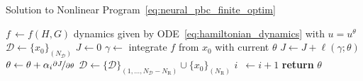 \begin{algorithm}
\caption{Solution to Nonlinear Program~\eqref{eq:neural_pbc_finite_optim}}
\label{algo:neuralpbc}
\small
\begin{algorithmic}[1]
    \algrenewcommand\algorithmicindent{0em} %
    \State $f \,\gets f(H,G)$ dynamics given by ODE~\eqref{eq:hamiltonian_dynamics} with $u = u^\theta$
    \State $\mathcal{D} \gets \{x_0\}_{(N_{\mathcal{D}})}$  
    \algrenewcommand\algorithmicindent{1.5em} %
        \State $J \gets 0$
            \State $\gamma \gets$ integrate $f$ from $x_0$ with current $\theta$
            \State $J \gets J + \ell(\gamma; \theta)$
        \EndFor
        \State $\theta \gets \theta + \alpha_i \nicefrac{\partial J}{\partial \theta}$
    \EndFor
    \State $\mathcal{D} \gets \{\mathcal{D}\}_{(1,\ldots,N_{\mathcal{D}}-N_{\textrm{R}})} \cup \{x_0\}_{(N_{\textrm{R}})}$
    \State $i \;\:\gets i + 1$
    \EndWhile
    \State \textbf{return} $\theta$
    \EndProcedure
\end{algorithmic}
\end{algorithm}


